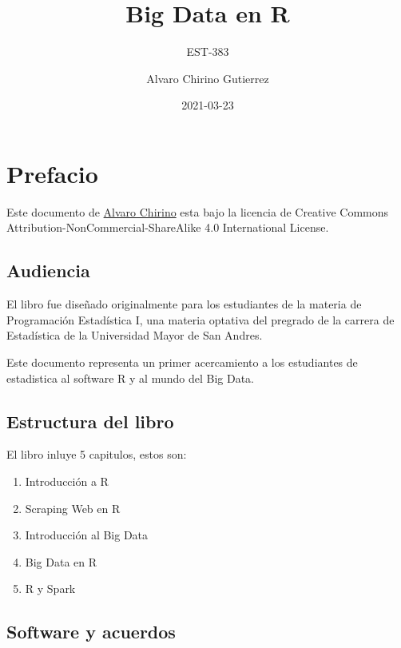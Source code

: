 \documentclass[
]{book}
\title{Big Data en R}
\subtitle{EST-383}
\author{Alvaro Chirino Gutierrez}
\date{2021-03-23}
\providecommand{\tightlist}{%
  \setlength{\itemsep}{0pt}\setlength{\parskip}{0pt}}
\begin{document}
\maketitle

{
\setcounter{tocdepth}{1}
\tableofcontents
}
\hypertarget{prefacio}{%
\chapter*{Prefacio}\label{prefacio}}

Este documento de \href{https://twiiter/alvarochirinog}{Alvaro Chirino} esta bajo la licencia de Creative Commons Attribution-NonCommercial-ShareAlike 4.0 International License.

\hypertarget{audiencia}{%
\section*{Audiencia}\label{audiencia}}

El libro fue diseñado originalmente para los estudiantes de la materia de Programación Estadística I, una materia optativa del pregrado de la carrera de Estadística de la Universidad Mayor de San Andres.

Este documento representa un primer acercamiento a los estudiantes de estadistica al software R y al mundo del Big Data.

\hypertarget{estructura-del-libro}{%
\section*{Estructura del libro}\label{estructura-del-libro}}

El libro inluye 5 capitulos, estos son:

\begin{enumerate}
\def\labelenumi{\arabic{enumi}.}
\tightlist
\item
  Introducción a R
\item
  Scraping Web en R
\item
  Introducción al Big Data
\item
  Big Data en R
\item
  R y Spark
\end{enumerate}

\hypertarget{software-y-acuerdos}{%
\section*{Software y acuerdos}\label{software-y-acuerdos}}
\end{document}
